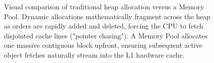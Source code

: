 \begin{figure}[htbp]
{%
    }
    \caption{Visual comparison of traditional heap allocation versus a Memory Pool. Dynamic allocations mathematically fragment across the heap as orders are rapidly added and deleted, forcing the CPU to fetch disjointed cache lines ("pointer chasing"). A Memory Pool allocates one massive contiguous block upfront, ensuring subsequent active object fetches naturally stream into the L1 hardware cache.}
    \label{fig:memory_pool}
\end{figure}
